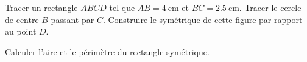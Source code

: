 
\begin{exercice}\label{exosmath-0992}

    Tracer un rectangle $ABCD$ tel que $AB = \SI{4}{\centi\meter}$ et $BC = \SI{2.5}{\centi\meter}$. Tracer le cercle de centre $B$ passant par $C$. Construire le symétrique de cette figure par rapport au point $D$.

    Calculer l'aire et le périmètre du rectangle symétrique.

\end{exercice}
